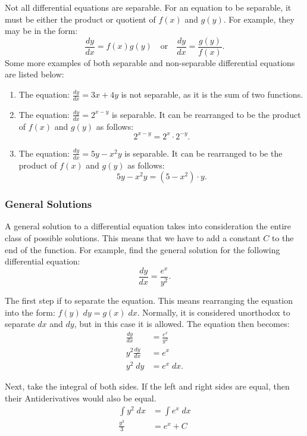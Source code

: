 \documentclass[12pt]{article}
\begin{document}
Not all differential equations are separable. For an equation to be separable, it must be either the product or quotient of $f(x)$ and $g(y)$. For example, they may be in the form:
\[ \frac{dy}{dx} = f(x) g(y) \quad \text{or} \quad \frac{dy}{dx} = \frac{g(y)}{f(x)}. \]
Some more examples of both separable and non-separable differential equations are listed below:
\begin{enumerate}
	\item The equation: $\frac{dy}{dx} = 3x + 4y$ is not separable, as it is the sum of two functions.
	\item The equation: $\frac{dy}{dx} = 2^{x - y}$ is separable. It can be rearranged to be the product of $f(x)$ and $g(y)$ as follows:
	\[ 2^{x - y} = 2^x \cdot 2^{-y}. \]
	\item The equation: $\frac{dy}{dx} = 5y - x^2 y$ is separable. It can be rearranged to be the product of $f(x)$ and $g(y)$ as follows:
	\[ 5y - x^2 y = (5 - x^2) \cdot y. \]
\end{enumerate}

\subsubsection{General Solutions}
A general solution to a differential equation takes into consideration the entire class of possible solutions. This means that we have to add a constant $C$ to the end of the function. For example, find the general solution for the following differential equation:
\[ \frac{dy}{dx} = \frac{e^x}{y^2}. \]

\noindent The first step if to separate the equation. This means rearranging the equation into the form: $f(y) \; dy = g(x) \; dx$. Normally, it is considered unorthodox to separate $dx$ and $dy$, but in this case it is allowed. The equation then becomes:
\begin{align*}
	\frac{dy}{dx} &= \frac{e^x}{y^2} \\[5pt]
	y^2 \frac{dy}{dx} &= e^x \\[5pt]
	y^2 \; dy &= e^x \; dx.
\end{align*}

\noindent Next, take the integral of both sides. If the left and right sides are equal, then their Antiderivatives would also be equal.
\begin{align*}
	\int y^2 \; dx &= \int e^x \; dx \\[5pt]
	\frac{y^3}{3} &= e^x + C
\end{align*}
\end{document}
